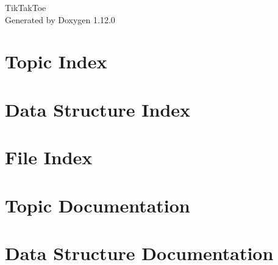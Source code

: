 \documentclass[twoside]{book}
\newcommand{\+}{\discretionary{\mbox{\scriptsize$\hookleftarrow$}}{}{}}
\newcommand{\clearemptydoublepage}{%
    \newpage{\pagestyle{empty}\cleardoublepage}%
  }
\begin{document}
  \raggedbottom
    \hypersetup{pageanchor=false,
                bookmarksnumbered=true,
                pdfencoding=unicode
               }
  \begin{titlepage}
  \vspace*{7cm}
  \begin{center}%
  {\Large Tik\+Tak\+Toe}\\
  \vspace*{1cm}
  {\large Generated by Doxygen 1.12.0}\\
  \end{center}
  \end{titlepage}
  \clearemptydoublepage
  \tableofcontents
  \clearemptydoublepage
  \hypersetup{pageanchor=true}



\chapter{Topic Index}

\chapter{Data Structure Index}

\chapter{File Index}

\chapter{Topic Documentation}




\chapter{Data Structure Documentation}







\end{document}

